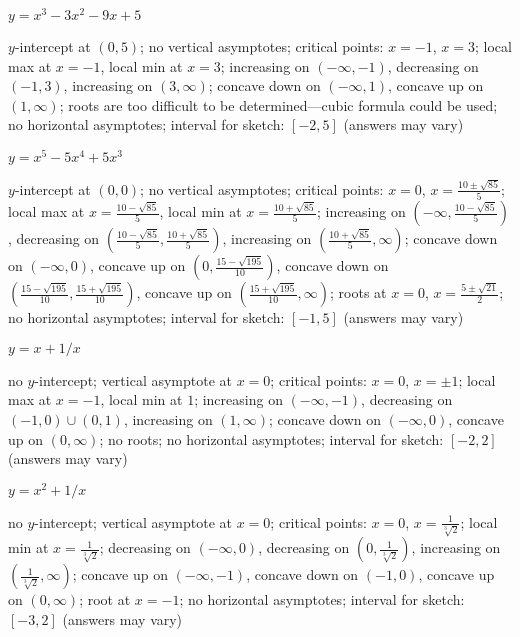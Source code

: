 \begin{exercises}
\begin{exercise} $y=x^3-3x^2-9x+5$
\begin{answer}
$y$-intercept at $(0,5)$; no vertical asymptotes; critical points:
  $x=-1$, $x= 3$; local max at $x=-1$, local min at $x=3$; increasing
  on $(-\infty,-1)$, decreasing on $(-1,3)$, increasing on
  $(3,\infty)$; concave down on $(-\infty,1)$, concave up on $(1,
  \infty)$; roots are too difficult to be determined---cubic formula
  could be used; no horizontal asymptotes; interval for sketch:
  $[-2,5]$ (answers may vary)
\end{answer}
\end{exercise}


\begin{exercise} $y=x^5-5x^4+5x^3$
\begin{answer}
$y$-intercept at $(0,0)$; no vertical asymptotes; critical points:
  $x=0$, $x= \frac{10\pm\sqrt{85}}{5}$; local max at $x=
  \frac{10-\sqrt{85}}{5}$, local min at $x= \frac{10+\sqrt{85}}{5}$;
  increasing on $(-\infty,\frac{10-\sqrt{85}}{5})$, decreasing on
  $(\frac{10-\sqrt{85}}{5}, \frac{10+\sqrt{85}}{5})$, increasing on
  $(\frac{10+\sqrt{85}}{5},\infty)$; concave down on $(-\infty,0)$,
  concave up on $(0, \frac{15-\sqrt{195}}{10})$, concave down on
  $(\frac{15-\sqrt{195}}{10},\frac{15+\sqrt{195}}{10})$, concave up on
  $(\frac{15+\sqrt{195}}{10},\infty)$; roots at $x=0$, $x= \frac{5\pm
    \sqrt{21}}{2}$; no horizontal asymptotes; interval for sketch:
  $[-1,5]$ (answers may vary)
\end{answer}
\end{exercise}


\begin{exercise} $y = x+ 1/x$
\begin{answer}
no $y$-intercept; vertical asymptote at $x=0$; critical points: $x=0$,
$x=\pm 1$; local max at $x=-1$, local min at $1$; increasing on
$(-\infty,-1)$, decreasing on $(-1,0)\cup(0,1)$, increasing on
$(1,\infty)$; concave down on $(-\infty,0)$, concave up on $(0,
\infty)$; no roots; no horizontal asymptotes; interval for sketch:
$[-2,2]$ (answers may vary)
\end{answer}
\end{exercise}

\begin{exercise} $y = x^2+ 1/x$
\begin{answer}
no $y$-intercept; vertical asymptote at $x=0$; critical points: $x=0$,
$x=\frac{1}{\sqrt[3]{2}}$; local min at $x=\frac{1}{\sqrt[3]{2}}$;
decreasing on $(-\infty,0)$, decreasing on
$(0,\frac{1}{\sqrt[3]{2}})$, increasing on
$(\frac{1}{\sqrt[3]{2}},\infty)$; concave up on $(-\infty,-1)$,
concave down on $(-1,0)$, concave up on $(0,\infty)$; root at $x=-1$;
no horizontal asymptotes; interval for sketch: $[-3,2]$ (answers may
vary)
\end{answer}
\end{exercise}





\endtwocol

\end{exercises}
